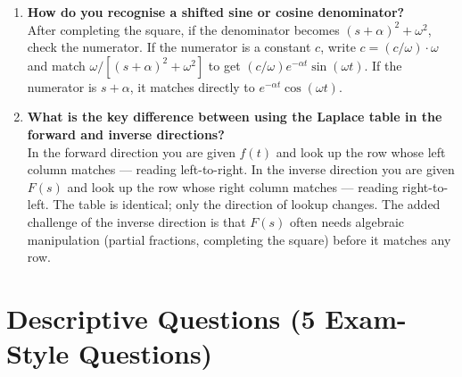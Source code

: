 \documentclass[12pt,a4paper]{article}
\begin{document}
\begin{enumerate}[leftmargin=*, label=\textbf{Q\arabic*.}]
\item \textbf{How do you recognise a shifted sine or cosine denominator?}\\
    After completing the square, if the denominator becomes $(s+\alpha)^2+\omega^2$,
    check the numerator.  If the numerator is a constant $c$, write
    $c = (c/\omega)\cdot\omega$ and match $\omega/[(s+\alpha)^2+\omega^2]$ to get
    $(c/\omega)e^{-\alpha t}\sin(\omega t)$.  If the numerator is $s+\alpha$, it
    matches directly to $e^{-\alpha t}\cos(\omega t)$.

\item \textbf{What is the key difference between using the Laplace table in the
forward and inverse directions?}\\
    In the forward direction you are given $f(t)$ and look up the row whose
    left column matches --- reading left-to-right.  In the inverse direction
    you are given $F(s)$ and look up the row whose right column matches ---
    reading right-to-left.  The table is identical; only the direction of
    lookup changes.  The added challenge of the inverse direction is that
    $F(s)$ often needs algebraic manipulation (partial fractions, completing
    the square) before it matches any row.

\end{enumerate}

\section{Descriptive Questions (5 Exam-Style Questions)}
\end{document}
